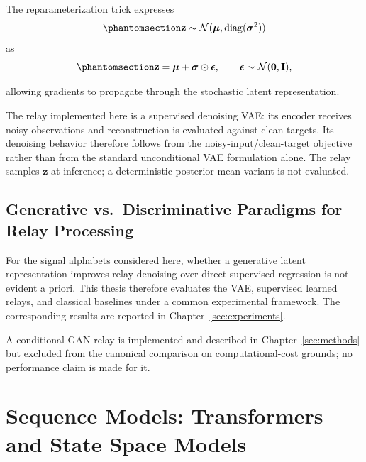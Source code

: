 The reparameterization trick expresses
\begin{equation}\protect\phantomsection\label{eq:reparameterization}
\mathbf{z}
\sim
\mathcal{N}
(\boldsymbol{\mu},\operatorname{diag}(\boldsymbol{\sigma}^2))
\end{equation}
as
\begin{equation}\protect\phantomsection\label{eq:reparameterization-sample}
\mathbf{z}
=
\boldsymbol{\mu}
+
\boldsymbol{\sigma}\odot\boldsymbol{\epsilon},
\qquad
\boldsymbol{\epsilon}\sim\mathcal{N}(\mathbf{0},\mathbf{I}),
\end{equation}
allowing gradients to propagate through the stochastic latent representation.

The relay implemented here is a supervised denoising VAE: its encoder receives noisy observations and reconstruction is evaluated against clean targets. Its denoising behavior therefore follows from the noisy-input/clean-target objective rather than from the standard unconditional VAE formulation alone. The relay samples \(\mathbf{z}\) at inference; a deterministic posterior-mean variant is not evaluated.

\subsection{Generative vs.~Discriminative Paradigms for Relay Processing}\label{sec:generative-vs.-discriminative-paradigms-for-relay-processing}

For the signal alphabets considered here, whether a generative latent representation improves relay denoising over direct supervised regression is not evident a priori. This thesis therefore evaluates the VAE, supervised learned relays, and classical baselines under a common experimental framework. The corresponding results are reported in Chapter~\ref{sec:experiments}.

A conditional GAN relay is implemented and described in Chapter~\ref{sec:methods} but excluded from the canonical comparison on computational-cost grounds; no performance claim is made for it.

\section{Sequence Models: Transformers and State Space Models}\label{sec:sequence-models-transformers-and-state-space-models}

